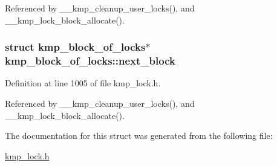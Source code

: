 Referenced by \-\_\-\-\_\-kmp\-\_\-cleanup\-\_\-user\-\_\-locks(), and \-\_\-\-\_\-kmp\-\_\-lock\-\_\-block\-\_\-allocate().

\hypertarget{structkmp__block__of__locks_acd79fe8422ca10aef0f7a31340f2bd5d}{
\subsubsection[{next\-\_\-block}]{\setlength{\rightskip}{0pt plus 5cm}struct {\bf kmp\-\_\-block\-\_\-of\-\_\-locks}$\ast$ kmp\-\_\-block\-\_\-of\-\_\-locks\-::next\-\_\-block}}\label{structkmp__block__of__locks_acd79fe8422ca10aef0f7a31340f2bd5d}


Definition at line 1005 of file kmp\-\_\-lock.\-h.



Referenced by \-\_\-\-\_\-kmp\-\_\-cleanup\-\_\-user\-\_\-locks(), and \-\_\-\-\_\-kmp\-\_\-lock\-\_\-block\-\_\-allocate().



The documentation for this struct was generated from the following file\-:\begin{DoxyCompactItemize}
\item 
\hyperlink{kmp__lock_8h}{kmp\-\_\-lock.\-h}\end{DoxyCompactItemize}
